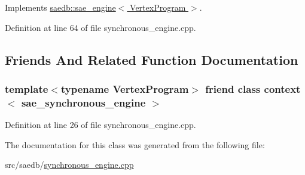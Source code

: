 Implements \hyperlink{classsaedb_1_1sae__engine_aa4e0b1b7ab5dcdf3baa48ae0d798b30b}{saedb\-::sae\-\_\-engine$<$ Vertex\-Program $>$}.



Definition at line 64 of file synchronous\-\_\-engine.\-cpp.



\subsection{Friends And Related Function Documentation}
\hypertarget{classsaedb_1_1sae__synchronous__engine_a72bdaebdaeffea541642d5d80c4ab985}{
\subsubsection[{context$<$ sae\-\_\-synchronous\-\_\-engine $>$}]{\setlength{\rightskip}{0pt plus 5cm}template$<$typename Vertex\-Program$>$ friend class {\bf context}$<$ {\bf sae\-\_\-synchronous\-\_\-engine} $>$\hspace{0.3cm}{\ttfamily [friend]}}}\label{d7/d39/classsaedb_1_1sae__synchronous__engine_a72bdaebdaeffea541642d5d80c4ab985}


Definition at line 26 of file synchronous\-\_\-engine.\-cpp.



The documentation for this class was generated from the following file\-:\begin{DoxyCompactItemize}
\item 
src/saedb/\hyperlink{synchronous__engine_8cpp}{synchronous\-\_\-engine.\-cpp}\end{DoxyCompactItemize}
